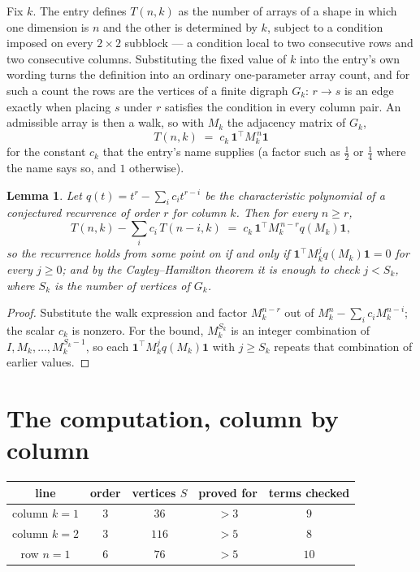 \documentclass[11pt,a4paper]{article}
\theoremstyle{plain}
\newtheorem{lemma}[theorem]{Lemma}
\theoremstyle{definition}
\begin{document}
Fix $k$. The entry defines $T(n,k)$ as the number of arrays of a shape in which one dimension
is $n$ and the other is determined by $k$, subject to a condition imposed on every
$2\times2$ subblock --- a condition local to two consecutive rows and two consecutive columns.
Substituting the fixed value of $k$ into the entry's own wording turns the definition into an
ordinary one-parameter array count, and for such a count the rows are the vertices of a finite
digraph $G_k$: $r\to s$ is an edge exactly when placing $s$ under $r$ satisfies the condition
in every column pair. An admissible array is then a walk, so with $M_k$ the adjacency matrix
of $G_k$,
\[
T(n,k)\;=\;c_k\,\mathbf{1}^{\!\top}M_k^{\,n}\mathbf{1}
\]
for the constant $c_k$ that the entry's name supplies (a factor such as $\tfrac12$ or
$\tfrac14$ where the name says so, and $1$ otherwise).

\begin{lemma}\label{lem:crit}
Let $q(t)=t^{r}-\sum_i c_it^{r-i}$ be the characteristic polynomial of a conjectured
recurrence of order $r$ for column $k$. Then for every $n\ge r$,
\[
T(n,k)-\sum_i c_i\,T(n-i,k)\;=\;c_k\,\mathbf{1}^{\!\top}M_k^{\,n-r}q(M_k)\mathbf{1},
\]
so the recurrence holds from some point on if and only if
$\mathbf{1}^{\!\top}M_k^{j}q(M_k)\mathbf{1}=0$ for every $j\ge0$; and by the
Cayley--Hamilton theorem it is enough to check $j<S_k$, where $S_k$ is the number of vertices
of $G_k$.
\end{lemma}

\begin{proof}
Substitute the walk expression and factor $M_k^{n-r}$ out of $M_k^{n}-\sum_ic_iM_k^{n-i}$;
the scalar $c_k$ is nonzero. For the bound, $M_k^{S_k}$ is an integer combination of
$I,M_k,\dots,M_k^{S_k-1}$, so each $\mathbf{1}^{\!\top}M_k^{j}q(M_k)\mathbf{1}$ with
$j\ge S_k$ repeats that combination of earlier values.
\end{proof}

\section{The computation, column by column}

\begin{center}
\begin{tabular}{ccccc}
line & order & vertices $S$ & proved for & terms checked \\ \hline
column $k$$=1$ & $3$ & $36$ & $>3$ & $9$ \\
column $k$$=2$ & $3$ & $116$ & $>5$ & $8$ \\
row $n$$=1$ & $6$ & $76$ & $>5$ & $10$ \\
\end{tabular}
\end{center}
\end{document}
